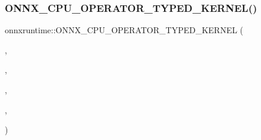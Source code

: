 \subsubsection{\texorpdfstring{O\+N\+N\+X\+\_\+\+C\+P\+U\+\_\+\+O\+P\+E\+R\+A\+T\+O\+R\+\_\+\+T\+Y\+P\+E\+D\+\_\+\+K\+E\+R\+N\+E\+L()}{ONNX\_CPU\_OPERATOR\_TYPED\_KERNEL()}\hspace{0.1cm}{\footnotesize\ttfamily [15/24]}}
{\footnotesize\ttfamily onnxruntime\+::\+O\+N\+N\+X\+\_\+\+C\+P\+U\+\_\+\+O\+P\+E\+R\+A\+T\+O\+R\+\_\+\+T\+Y\+P\+E\+D\+\_\+\+K\+E\+R\+N\+EL (\begin{DoxyParamCaption}\item[{\mbox{\hyperlink{classonnxruntime_1_1Cast}{Cast}}}]{,  }\item[{6}]{,  }\item[{\mbox{\hyperlink{uniononnxruntime_1_1MLFloat16}{M\+L\+Float16}}}]{,  }\item[{\mbox{\hyperlink{classonnxruntime_1_1KernelDefBuilder}{Kernel\+Def\+Builder}}().Type\+Constraint(\char`\"{}T1\char`\"{}, Data\+Type\+Impl\+::\+Get\+Tensor\+Type$<$ \mbox{\hyperlink{uniononnxruntime_1_1MLFloat16}{M\+L\+Float16}} $>$()).Type\+Constraint(\char`\"{}T2\char`\"{}, cast\+Op\+Type\+Constraints)}]{,  }\item[{\mbox{\hyperlink{classonnxruntime_1_1Cast}{Cast}}$<$ \mbox{\hyperlink{uniononnxruntime_1_1MLFloat16}{M\+L\+Float16}} $>$}]{ }\end{DoxyParamCaption})}

\mbox{\label{namespaceonnxruntime_a46dc6618b921c9c8f00289cab5f7d07e}} 
